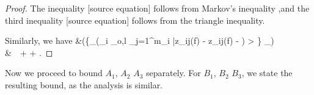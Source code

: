 \documentclass[twoside,11pt]{article}
\makeatletter
\newcommand{\rev}[1]{{\color{revisionred}#1}}
\newcommand{\discardlabel}[1]{}
\newcommand{\discardtwo}[2]{}
\newcommand{\legacyref}[1]{\textup{[source ref.]}}
\newcommand{\legacyeqref}[1]{\textup{[source equation]}}
\newenvironment{legacycomparison}{%
  \begingroup\color{legacygray}%
  \let\label\discardlabel
  \let\originallabel\discardlabel
  \let\ref\legacyref
  \let\pageref\legacyref
  \let\eqref\legacyeqref
  \let\cref\legacyref
  \let\Cref\legacyref
  \let\autoref\legacyref
  \let\aliasref\discardtwo
}{\endgroup}
\newcommand{\aliasref}[2]{%
  \@ifundefined{r@#2}{}{%
    \expandafter\let\csname r@#1\expandafter\endcsname\csname r@#2\endcsname}}
\makeatother
\begin{document}
\begin{legacycomparison}
\begin{proof}
The inequality \eqref{in506} follows from Markov's inequality
  ,and the third inequality \eqref{in507} follows from the triangle inequality.   


Similarly, we have 
\bea 
&\sP\left(\left\{\sup_{}\left(\sum_{i \in {}_{o,l}} \sum_{j=1}^{m_i} \bar z_{ij}(f) - \hat z_{ij}(f) - \right) > \right\} \cap \Omega_\beta\right) \\
& \,\leq\, 
 +  + . 
\bea 
\end{proof}
Now we proceed to bound $A_1$, $A_2$ $A_3$ separately. 
For $B_1$, $B_2$ $B_3$, \rev{we state the resulting bound}, as the analysis is similar.  






\end{legacycomparison}
\end{document}
